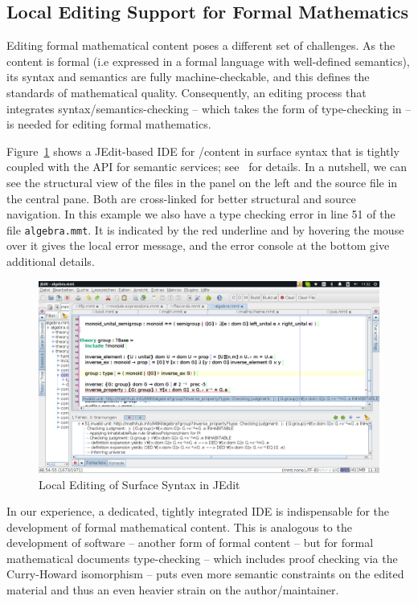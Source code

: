 
\subsection{Local Editing Support for Formal Mathematics}\label{sec:local-formal}

Editing formal mathematical content poses a different set of challenges. As the content is
formal (i.e expressed in a formal language with well-defined semantics), its syntax and
semantics are fully machine-checkable, and this defines the standards of mathematical
quality. Consequently, an editing process that integrates syntax/semantics-checking --
which takes the form of type-checking in \mmt -- is needed for editing formal mathematics.

Figure~\ref{fig:jedit2} shows a JEdit-based IDE for \omdoc/\mmt content in \mmt surface
syntax that is tightly coupled with the \mmt API for semantic services;
see~\cite{Rabe:LII14} for details. In a nutshell, we can see the structural view of the
files in the panel on the left and the source file in the central pane. Both are
cross-linked for better structural and source navigation. In this example we also have a
type checking error in line 51 of the file \texttt{algebra.mmt}. It is indicated by the
red underline and by hovering the mouse over it gives the local error message, and the
error console at the bottom give additional details.

\begin{figure}[ht]\centering
  \includegraphics[width=\textwidth]{jedit2}
  \caption{Local Editing of \mmt Surface Syntax in JEdit}\label{fig:jedit2}
\end{figure}

In our experience, a dedicated, tightly integrated IDE is indispensable for the
development of formal mathematical content. This is analogous to the development of
software -- another form of formal content -- but for formal mathematical documents
type-checking -- which includes proof checking via the Curry-Howard isomorphism -- puts
even more semantic constraints on the edited material and thus an even heavier strain on
the author/maintainer.

